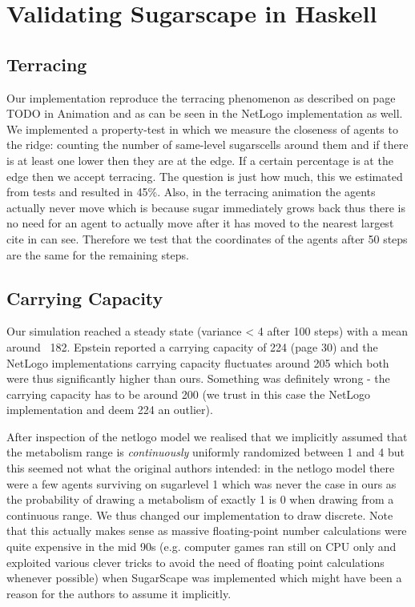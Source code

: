\section{Validating Sugarscape in Haskell}
\label{app:validation}

\subsection{Terracing}
Our implementation reproduce the terracing phenomenon as described on page TODO in Animation and as can be seen in the NetLogo implementation as well. We implemented a property-test in which we measure the closeness of agents to the ridge: counting the number of same-level sugarscells around them and if there is at least one lower then they are at the edge. If a certain percentage is at the edge then we accept terracing. The question is just how much, this we estimated from tests and resulted in 45\%. Also, in the terracing animation the agents actually never move which is because sugar immediately grows back thus there is no need for an agent to actually move after it has moved to the nearest largest cite in can see. Therefore we test that the coordinates of the agents after 50 steps are the same for the remaining steps.

\subsection{Carrying Capacity}
Our simulation reached a steady state (variance < 4 after 100 steps) with a mean around ~182. Epstein reported a carrying capacity of 224 (page 30) and the NetLogo implementations carrying capacity fluctuates around 205 which both were thus significantly higher than ours. Something was definitely wrong - the carrying capacity has to be around 200 (we trust in this case the NetLogo implementation and deem 224 an outlier).

After inspection of the netlogo model we realised that we implicitly assumed that the metabolism range is \textit{continuously} uniformly randomized between 1 and 4 but this seemed not what the original authors intended: in the netlogo model there were a few agents surviving on sugarlevel 1 which was never the case in ours as the probability of drawing a metabolism of exactly 1 is 0 when drawing from a continuous range. We thus changed our implementation to draw discrete. Note that this actually makes sense as massive floating-point number calculations were quite expensive in the mid 90s (e.g. computer games ran still on CPU only and exploited various  clever tricks to avoid the need of floating point calculations whenever possible) when SugarScape was implemented which might have been a reason for the authors to assume it implicitly.

